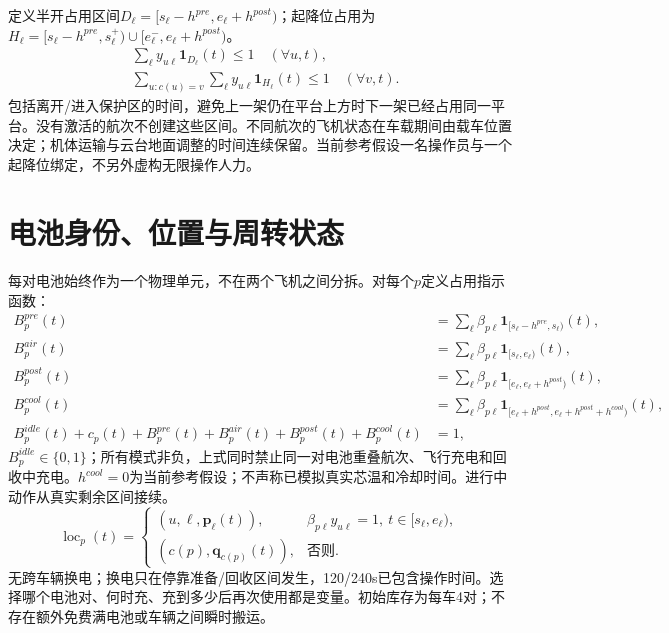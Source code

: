 \noindent 定义半开占用区间$D_\ell=[s_\ell-h^{pre},e_\ell+h^{post})$；起降位占用为$H_\ell=[s_\ell-h^{pre},s_\ell^+)\cup[e_\ell^-,e_\ell+h^{post})$。
\begin{align}
 &\sum_{\ell}y_{u\ell}\mathbf1_{D_\ell}(t)\le1\quad(\forall u,t),\\
 &\sum_{u:c(u)=v}\sum_{\ell}y_{u\ell}\mathbf1_{H_\ell}(t)\le1
                         \quad(\forall v,t).
 \label{eng:eq:pad}
\end{align}
\noindent 包括离开/进入保护区的时间，避免上一架仍在平台上方时下一架已经占用同一平台。没有激活的航次不创建这些区间。不同航次的飞机状态在车载期间由载车位置决定；机体运输与云台地面调整的时间连续保留。当前参考假设一名操作员与一个起降位绑定，不另外虚构无限操作人力。
\clearpage

\section{电池身份、位置与周转状态}
\noindent 每对电池始终作为一个物理单元，不在两个飞机之间分拆。对每个$p$定义占用指示函数：
\begin{align}
 B_p^{pre}(t)&=\sum_\ell\beta_{p\ell}\mathbf1_{[s_\ell-h^{pre},s_\ell)}(t),\\
 B_p^{air}(t)&=\sum_\ell\beta_{p\ell}\mathbf1_{[s_\ell,e_\ell)}(t),\\
 B_p^{post}(t)&=\sum_\ell\beta_{p\ell}\mathbf1_{[e_\ell,e_\ell+h^{post})}(t),\\
 B_p^{cool}(t)&=\sum_\ell\beta_{p\ell}\mathbf1_{[e_\ell+h^{post},e_\ell+h^{post}+h^{cool})}(t),\\
 B_p^{idle}(t)+c_p(t)+B_p^{pre}(t)+B_p^{air}(t)+B_p^{post}(t)+B_p^{cool}(t)&=1,
 \label{eng:eq:batteryavailability}
\end{align}
\noindent $B_p^{idle}\in\{0,1\}$；所有模式非负，上式同时禁止同一对电池重叠航次、飞行充电和回收中充电。$h^{cool}=0$为当前参考假设；不声称已模拟真实芯温和冷却时间。进行中动作从真实剩余区间接续。
\begin{equation}
 \operatorname{loc}_p(t)=
 \begin{cases}
 (u,\ell,\mathbf p_\ell(t)),&\beta_{p\ell}y_{u\ell}=1,\ t\in[s_\ell,e_\ell),\\
 (c(p),\mathbf q_{c(p)}(t)),&\text{否则}.
 \end{cases}
 \label{eng:eq:batterylocation}
\end{equation}
\noindent 无跨车辆换电；换电只在停靠准备/回收区间发生，120/240s已包含操作时间。选择哪个电池对、何时充、充到多少后再次使用都是变量。初始库存为每车4对；不存在额外免费满电池或车辆之间瞬时搬运。

